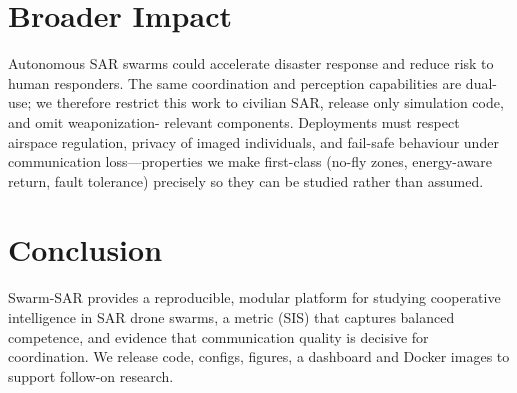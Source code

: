 \documentclass[twocolumn,10pt]{article}
\begin{document}
\section{Broader Impact}
Autonomous SAR swarms could accelerate disaster response and reduce risk to human
responders. The same coordination and perception capabilities are dual-use; we therefore
restrict this work to civilian SAR, release only simulation code, and omit weaponization-
relevant components. Deployments must respect airspace regulation, privacy of imaged
individuals, and fail-safe behaviour under communication loss---properties we make
first-class (no-fly zones, energy-aware return, fault tolerance) precisely so they can be
studied rather than assumed.

\section{Conclusion}
Swarm-SAR provides a reproducible, modular platform for studying cooperative
intelligence in SAR drone swarms, a metric (SIS) that captures balanced
competence, and evidence that communication quality is decisive for coordination.
We release code, configs, figures, a dashboard and Docker images to support
follow-on research.


\end{document}
